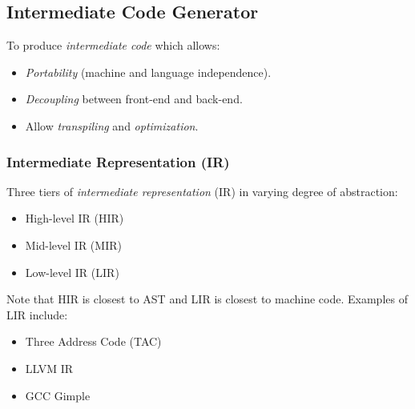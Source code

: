 \subsection{Intermediate Code Generator}

To produce \textit{intermediate code} which allows:
\begin{itemize}
    \item \textit{Portability} (machine and language independence).
    \item \textit{Decoupling} between front-end and back-end.
    \item Allow \textit{transpiling} and \textit{optimization}.
\end{itemize}

\subsubsection{Intermediate Representation (IR)}

Three tiers of \textit{intermediate representation} (IR) in varying degree of abstraction:
\begin{itemize}
    \item High-level IR (HIR)
    \item Mid-level IR (MIR)
    \item Low-level IR (LIR)
\end{itemize}

Note that HIR is closest to AST and LIR is closest to machine code. Examples of LIR include:
\begin{itemize}
    \item Three Address Code (TAC)
    \item LLVM IR
    \item GCC Gimple
\end{itemize}
